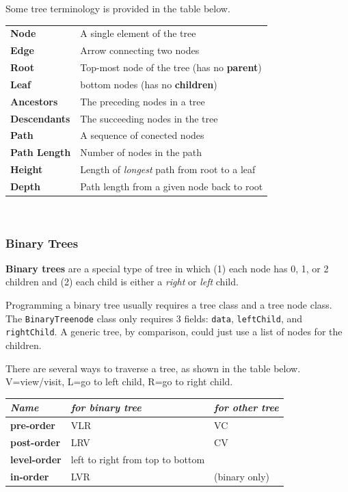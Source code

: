 Some tree terminology is provided in the table below. \\


\begin{tabular}{p{}p{}}
\textbf{Node} & A single element of the tree \\
\textbf{Edge} & Arrow connecting two nodes \\
\textbf{Root} & Top-most node of the tree (has no \textbf{parent}) \\
\textbf{Leaf} & bottom nodes (has no \textbf{children}) \\
\textbf{Ancestors} & The preceding nodes in a tree \\
\textbf{Descendants} & The succeeding nodes in the tree \\
\textbf{Path} & A sequence of conected nodes \\
\textbf{Path Length} & Number of nodes in the path \\
\textbf{Height} & Length of \textit{longest} path from root to a leaf \\
\textbf{Depth} & Path length from a given node back to root \\
\end{tabular} \\

\subsubsection{Binary Trees}

\textbf{Binary trees} are a special type of tree in which (1) each node has 0, 1, or 2 children and (2) each child is either a \textit{right} or \textit{left} child. 

Programming a binary tree usually requires a tree class and a tree node class. The \texttt{BinaryTreenode} class only requires 3 fields: \texttt{data}, \texttt{leftChild}, and \texttt{rightChild}. A generic tree, by comparison, could just use a list of nodes for the children. 

There are several ways to traverse a tree, as shown in the table below. V=view/visit, L=go to left child, R=go to right child. \\

\begin{tabular}{p{}p{}p{}}
\textit{Name} & \textit{for binary tree} & \textit{for other tree} \\
\hline
\textbf{pre-order} & VLR & VC \\
\textbf{post-order} & LRV & CV \\
\textbf{level-order} & left to right from top to bottom \\
\textbf{in-order} & LVR & (binary only) \\
\end{tabular} \\

